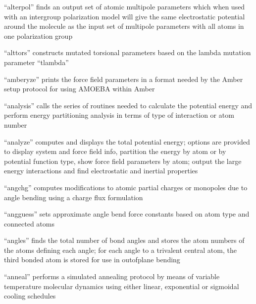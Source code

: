\documentclass[letterpaper,11pt,english]{sphinxmanual}
\begin{document}

“alterpol” finds an output set of atomic multipole parameters
which when used with an intergroup polarization model will
give the same electrostatic potential around the molecule as
the input set of multipole parameters with all atoms in one
polarization group


“alttors” constructs mutated torsional parameters based
on the lambda mutation parameter “tlambda”


“amberyze” prints the force field parameters in a format needed
by the Amber setup protocol for using AMOEBA within Amber


“analysis” calls the series of routines needed to calculate
the potential energy and perform energy partitioning analysis
in terms of type of interaction or atom number


“analyze” computes and displays the total potential energy;
options are provided to display system and force field info,
partition the energy by atom or by potential function type,
show force field parameters by atom; output the large energy
interactions and find electrostatic and inertial properties


“angchg” computes modifications to atomic partial charges or
monopoles due to angle bending using a charge flux formulation


“angguess” sets approximate angle bend force constants based
on atom type and connected atoms


“angles” finds the total number of bond angles and stores
the atom numbers of the atoms defining each angle; for
each angle to a trivalent central atom, the third bonded
atom is stored for use in out\sphinxhyphen{}of\sphinxhyphen{}plane bending


“anneal” performs a simulated annealing protocol by means of
variable temperature molecular dynamics using either linear,
exponential or sigmoidal cooling schedules
\end{document}
